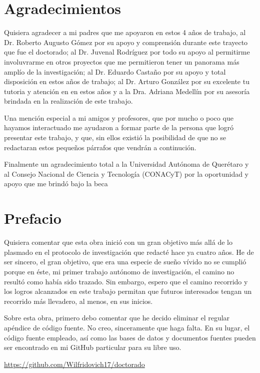 \chapter{Agradecimientos}

Quisiera agradecer a mi padres que me apoyaron en estos 4 años de trabajo, al Dr. Roberto Augusto Gómez por su apoyo y comprensión durante este trayecto que fue el doctorado; al Dr. Juvenal Rodríguez  por todo su apoyo al permitirme involuvrarme en otros proyectos que me permitieron tener un panorama más amplío de la investigación; al Dr. Eduardo Castaño por su apoyo y total disposición en estos años de trabajo; al Dr. Arturo González por su excelente tu tutoria y atención en en estos años y a la Dra. Adriana Medellín por su asesoría brindada en la realización de este trabajo.

Una mención especial a mi amigos y profesores, que por mucho o poco que hayamos interactuado me ayudaron a formar parte de la persona que logró presentar este trabajo, y que, sin ellos existió la posibilidad de que no se redactaran estos pequeños párrafos que vendrán a continución.

Finalmente un agradecimiento total a la Universidad Autónoma de Querétaro y al Consejo Nacional de Ciencia y Tecnología (CONACyT) por la oportunidad y apoyo que me brindó bajo la beca 

\cleardoublepage

\chapter{Prefacio}
\label{ch:prefacio}

Quisiera comentar que esta obra inició con un gran objetivo más allá de lo plasmado en el protocolo de investigación que redacté hace ya cuatro años. He de ser sincero, el gran objetivo, que era una especie de sueño vívido no se cumplió porque en éste, mi primer trabajo autónomo de investigación, el camino no resultó como había sido trazado. Sin embargo, espero que el camino recorrido y los logros alcanzados en este trabajo permitan que futuros interesados tengan un recorrido más llevadero, al menos, en sus inicios. 

Sobre esta obra, primero debo comentar que he decido eliminar el regular apéndice de código fuente. No creo, sinceramente que haga falta. En su lugar, el código fuente empleado, así como las bases de datos y documentos fuentes pueden ser encontrado en mi GitHub particular para su libre uso.

\begin{center}
	\url{https://github.com/Wilfridovich17/doctorado}
\end{center}


